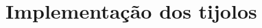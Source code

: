 \documentclass{beamer}
\begin{document}
\section{Implementação dos tijolos}


%
%	
%
%
%
%	
\end{document}
